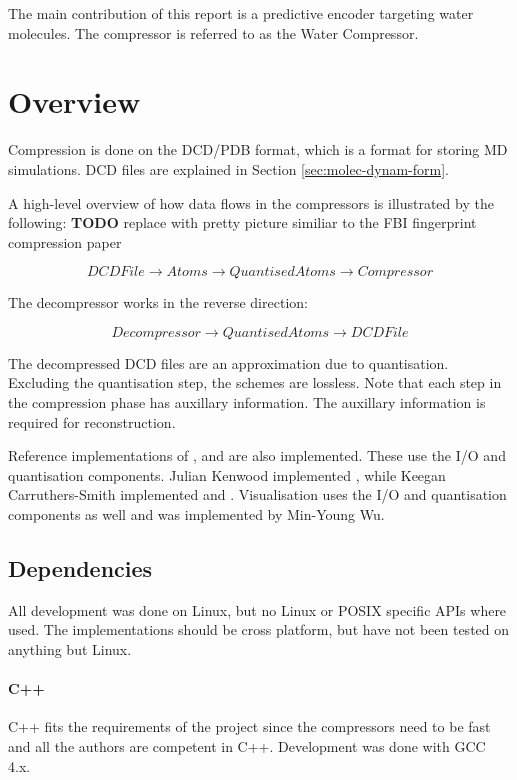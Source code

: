 \documentclass{report}
\newcommand{\todo}{\textbf{TODO} }
\begin{document}
The main contribution of this report is a predictive encoder targeting water
molecules. The compressor is referred to as the Water Compressor.

\section{Overview}

Compression is done on the DCD/PDB format, which is a format for storing MD
simulations. DCD files are explained in Section \ref{sec:molec-dynam-form}.

A high-level overview of how data flows in the compressors is illustrated by
the following: \todo replace with pretty picture similiar to the FBI
fingerprint compression paper

\[ DCDFile \to Atoms \to QuantisedAtoms \to Compressor \]

The decompressor works in the reverse direction:

\[ Decompressor \to QuantisedAtoms \to DCDFile \]

The decompressed DCD files are an approximation due to quantisation. Excluding
the quantisation step, the schemes are lossless. Note that each step in the
compression phase has auxillary information. The auxillary information is
required for reconstruction.

Reference implementations of \citep{devillers2000gci}, \citep{gumholdcomp} and
\citep{omeltchenko2000sls} are also implemented. These use the I/O and
quantisation components. Julian Kenwood implemented
\citep{omeltchenko2000sls}, while Keegan Carruthers-Smith implemented
\citep{devillers2000gci} and \citep{gumholdcomp}. Visualisation uses the I/O
and quantisation components as well and was implemented by Min-Young Wu.


\subsection{Dependencies}

All development was done on Linux, but no Linux or POSIX specific APIs where
used. The implementations should be cross platform, but have not been tested
on anything but Linux.

\paragraph{C++}
C++ fits the requirements of the project since the compressors need to be fast
and all the authors are competent in C++. Development was done with GCC 4.x.
\end{document}
